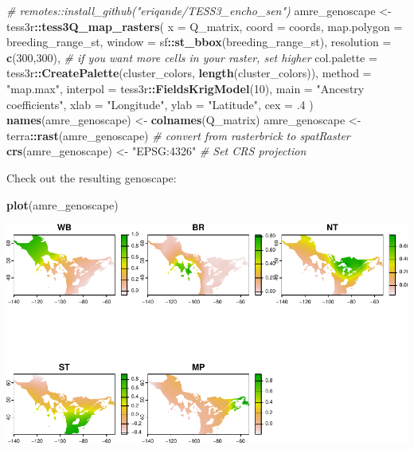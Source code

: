 \documentclass[
]{book}
\newenvironment{Shaded}{\begin{snugshade}}{\end{snugshade}}
\newcommand{\AttributeTok}[1]{\textcolor[rgb]{0.13,0.29,0.53}{#1}}
\newcommand{\CommentTok}[1]{\textcolor[rgb]{0.56,0.35,0.01}{\textit{#1}}}
\newcommand{\DecValTok}[1]{\textcolor[rgb]{0.00,0.00,0.81}{#1}}
\newcommand{\FunctionTok}[1]{\textcolor[rgb]{0.13,0.29,0.53}{\textbf{#1}}}
\newcommand{\NormalTok}[1]{#1}
\newcommand{\OtherTok}[1]{\textcolor[rgb]{0.56,0.35,0.01}{#1}}
\newcommand{\SpecialCharTok}[1]{\textcolor[rgb]{0.81,0.36,0.00}{\textbf{#1}}}
\newcommand{\StringTok}[1]{\textcolor[rgb]{0.31,0.60,0.02}{#1}}
\begin{document}
\begin{Shaded}
\begin{Highlighting}[]
\CommentTok{\# remotes::install\_github("eriqande/TESS3\_encho\_sen")}
\NormalTok{amre\_genoscape }\OtherTok{\textless{}{-}}\NormalTok{ tess3r}\SpecialCharTok{::}\FunctionTok{tess3Q\_map\_rasters}\NormalTok{(}
  \AttributeTok{x =}\NormalTok{ Q\_matrix,}
  \AttributeTok{coord =}\NormalTok{ coords,}
  \AttributeTok{map.polygon =}\NormalTok{ breeding\_range\_st,}
  \AttributeTok{window =}\NormalTok{ sf}\SpecialCharTok{::}\FunctionTok{st\_bbox}\NormalTok{(breeding\_range\_st),}
  \AttributeTok{resolution =} \FunctionTok{c}\NormalTok{(}\DecValTok{300}\NormalTok{,}\DecValTok{300}\NormalTok{), }\CommentTok{\# if you want more cells in your raster, set higher}
  \AttributeTok{col.palette =}\NormalTok{ tess3r}\SpecialCharTok{::}\FunctionTok{CreatePalette}\NormalTok{(cluster\_colors, }\FunctionTok{length}\NormalTok{(cluster\_colors)), }
  \AttributeTok{method =} \StringTok{"map.max"}\NormalTok{, }
  \AttributeTok{interpol =}\NormalTok{ tess3r}\SpecialCharTok{::}\FunctionTok{FieldsKrigModel}\NormalTok{(}\DecValTok{10}\NormalTok{),  }
  \AttributeTok{main =} \StringTok{"Ancestry coefficients"}\NormalTok{,}
  \AttributeTok{xlab =} \StringTok{"Longitude"}\NormalTok{, }
  \AttributeTok{ylab =} \StringTok{"Latitude"}\NormalTok{, }
  \AttributeTok{cex =}\NormalTok{ .}\DecValTok{4}
\NormalTok{)}
\FunctionTok{names}\NormalTok{(amre\_genoscape) }\OtherTok{\textless{}{-}} \FunctionTok{colnames}\NormalTok{(Q\_matrix)}
\NormalTok{amre\_genoscape }\OtherTok{\textless{}{-}}\NormalTok{ terra}\SpecialCharTok{::}\FunctionTok{rast}\NormalTok{(amre\_genoscape) }\CommentTok{\# convert from rasterbrick to spatRaster}
\FunctionTok{crs}\NormalTok{(amre\_genoscape) }\OtherTok{\textless{}{-}} \StringTok{"EPSG:4326"} \CommentTok{\# Set CRS projection}
\end{Highlighting}
\end{Shaded}

Check out the resulting genoscape:

\begin{Shaded}
\begin{Highlighting}[]
\FunctionTok{plot}\NormalTok{(amre\_genoscape)}
\end{Highlighting}
\end{Shaded}

\includegraphics{Mignette_files/figure-latex/unnamed-chunk-27-1.pdf}
\end{document}
